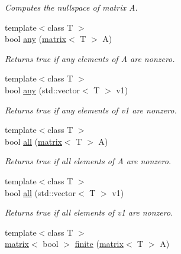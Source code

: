 \begin{DoxyCompactItemize}
\begin{DoxyCompactList}\small\item\em Computes the nullspace of matrix A. \end{DoxyCompactList}\item 
\hypertarget{namespacekeycpp_a1e0536b6efa09624ea3738bbb9975dea}{{\footnotesize template$<$class T $>$ }\\bool \hyperlink{namespacekeycpp_a1e0536b6efa09624ea3738bbb9975dea}{any} (\hyperlink{classkeycpp_1_1matrix}{matrix}$<$ T $>$ A)}\label{namespacekeycpp_a1e0536b6efa09624ea3738bbb9975dea}

\begin{DoxyCompactList}\small\item\em Returns true if any elements of A are nonzero. \end{DoxyCompactList}\item 
\hypertarget{namespacekeycpp_adee9ea3e8989009abba313a2f7d44d46}{{\footnotesize template$<$class T $>$ }\\bool \hyperlink{namespacekeycpp_adee9ea3e8989009abba313a2f7d44d46}{any} (std\-::vector$<$ T $>$ v1)}\label{namespacekeycpp_adee9ea3e8989009abba313a2f7d44d46}

\begin{DoxyCompactList}\small\item\em Returns true if any elements of v1 are nonzero. \end{DoxyCompactList}\item 
\hypertarget{namespacekeycpp_a6c576908958c419fc0cae34ce1a6a5c7}{{\footnotesize template$<$class T $>$ }\\bool \hyperlink{namespacekeycpp_a6c576908958c419fc0cae34ce1a6a5c7}{all} (\hyperlink{classkeycpp_1_1matrix}{matrix}$<$ T $>$ A)}\label{namespacekeycpp_a6c576908958c419fc0cae34ce1a6a5c7}

\begin{DoxyCompactList}\small\item\em Returns true if all elements of A are nonzero. \end{DoxyCompactList}\item 
\hypertarget{namespacekeycpp_afa8ea92aa5e5e801a2e42f2eefabd659}{{\footnotesize template$<$class T $>$ }\\bool \hyperlink{namespacekeycpp_afa8ea92aa5e5e801a2e42f2eefabd659}{all} (std\-::vector$<$ T $>$ v1)}\label{namespacekeycpp_afa8ea92aa5e5e801a2e42f2eefabd659}

\begin{DoxyCompactList}\small\item\em Returns true if all elements of v1 are nonzero. \end{DoxyCompactList}\item 
\hypertarget{namespacekeycpp_a092a180cc054e61d0dad651dd24ff990}{{\footnotesize template$<$class T $>$ }\\\hyperlink{classkeycpp_1_1matrix}{matrix}$<$ bool $>$ \hyperlink{namespacekeycpp_a092a180cc054e61d0dad651dd24ff990}{finite} (\hyperlink{classkeycpp_1_1matrix}{matrix}$<$ T $>$ A)}\label{namespacekeycpp_a092a180cc054e61d0dad651dd24ff990}


\end{DoxyCompactItemize}
